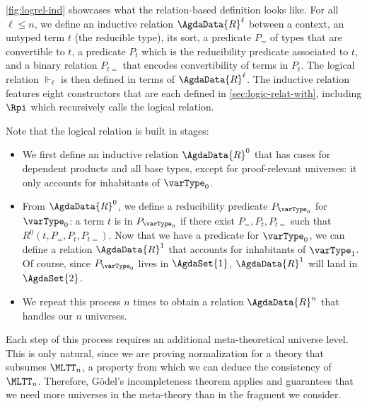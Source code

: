 \cref{fig:logrel-ind} showcases what the relation-based definition
looks like.
%
For all \( \ell \le n \), we define an inductive relation \( \AgdaData{R}^\ell \) between
a context, an untyped term \( t \) (the reducible type), its sort, a predicate \( P_{=} \) of
types that are convertible to \( t \), a predicate \( P_{t} \) which is the
reducibility predicate associated to \( t \), and a binary relation
\( P_{t=} \) that encodes convertibility of terms in \( P_{t} \).
%
The logical relation \( \Vdash_\ell \) is then defined in terms of \( \AgdaData{R}^\ell \).
%
The inductive relation features eight constructors that are each
defined in \cref{sec:logic-relat-with}, including \( \Rpi \)
which recursively calls the logical relation.

Note that the logical relation is built in stages:
\begin{itemize}
\item We first define an inductive relation
  \( \AgdaData{R}^0 \) that has cases for dependent products and all base types, except
  for proof-relevant universes: it only accounts for inhabitants of
  \( \varType_0 \).
\item From \( \AgdaData{R}^0 \), we define a reducibility predicate \( P_{\varType_0} \) for
  \( \varType_0 \): a term \( t \) is in \( P_{\varType_0} \) if there exist
  \( P_=, P_t, P_{t=} \) such that \( R^0(t,P_=, P_t, P_{t=}) \).
  Now that we have a predicate for \( \varType_0 \), we can define a relation
  \( \AgdaData{R}^1 \) that accounts for inhabitants of \( \varType_1 \). Of course, since
  \( P_{\varType_0} \) lives in \( \AgdaSet{1} \), \( \AgdaData{R}^1 \) will land in \( \AgdaSet{2} \).
\item We repeat this process \( n \) times to obtain a relation \( \AgdaData{R}^n \)
  that handles our \( n \) universes.
\end{itemize}
Each step of this process requires an additional meta-theoretical universe
level.
%
This is only natural, since we are proving normalization for a theory that
subsumes \( \MLTT_n \), a property from which we can deduce the consistency
of \( \MLTT_n \).
%
Therefore, Gödel's incompleteness theorem applies and guarantees that
we need more universes in the meta-theory than in the fragment we
consider.



